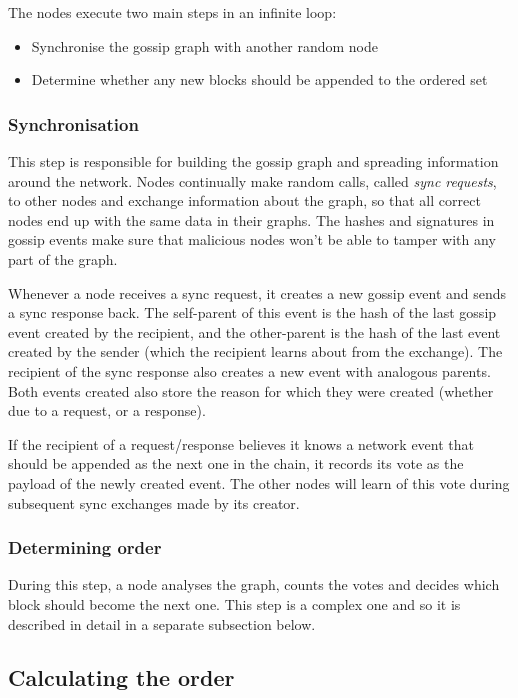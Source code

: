 \documentclass[a4paper,fleqn]{article}
\begin{document}
The nodes execute two main steps in an infinite loop:

\begin{itemize}
		\item Synchronise the gossip graph with another random node
		\item Determine whether any new blocks should be appended to the ordered set
\end{itemize}

\subsubsection{Synchronisation}

This step is responsible for building the gossip graph and spreading information around the
network. Nodes continually make random calls, called \emph{sync requests}, to other nodes and
exchange information about the graph, so that all correct nodes end up with the same data in their
graphs. The hashes and signatures in gossip events make sure that malicious nodes won't be able to
tamper with any part of the graph.

Whenever a node receives a sync request, it creates a new gossip event and sends a sync response
back. The self-parent of this event is the hash of the last gossip event created by the recipient,
and the other-parent is the hash of the last event created by the sender (which the recipient
learns about from the exchange). The recipient of the sync response also creates a new event with
analogous parents. Both events created also store the reason for which they were created (whether
due to a request, or a response).

If the recipient of a request/response believes it knows a network event that should be appended as
the next one in the chain, it records its vote as the payload of the newly created event. The other
nodes will learn of this vote during subsequent sync exchanges made by its creator.

\subsubsection{Determining order}

During this step, a node analyses the graph, counts the votes and decides which block should become
the next one. This step is a complex one and so it is described in detail in a separate subsection
below.

\subsection{Calculating the order}
\end{document}
